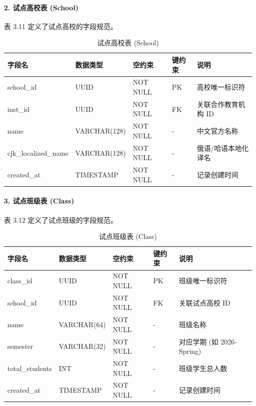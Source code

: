 \paragraph{2. 试点高校表 (School)}
表 3.11 定义了试点高校的字段规范。
\begin{table}[H]
\centering
\caption{试点高校表 (School)}
\begin{tabularx}{\textwidth}{l p{3.2cm} p{1.8cm} p{1.8cm} X}
\toprule
\textbf{字段名} & \textbf{数据类型} & \textbf{空约束} & \textbf{键约束} & \textbf{说明} \\
\midrule
school\_id & UUID & NOT NULL & PK & 高校唯一标识符 \\
inst\_id & UUID & NOT NULL & FK & 关联合作教育机构 ID \\
name & VARCHAR(128) & NOT NULL & - & 中文官方名称 \\
cjk\_localized\_name & VARCHAR(128) & NOT NULL & - & 俄语/哈语本地化译名 \\
created\_at & TIMESTAMP & NOT NULL & - & 记录创建时间 \\
\bottomrule
\end{tabularx}
\end{table}

\paragraph{3. 试点班级表 (Class)}
表 3.12 定义了试点班级的字段规范。
\begin{table}[H]
\centering
\caption{试点班级表 (Class)}
\begin{tabularx}{\textwidth}{l p{3.2cm} p{1.8cm} p{1.8cm} X}
\toprule
\textbf{字段名} & \textbf{数据类型} & \textbf{空约束} & \textbf{键约束} & \textbf{说明} \\
\midrule
class\_id & UUID & NOT NULL & PK & 班级唯一标识符 \\
school\_id & UUID & NOT NULL & FK & 关联试点高校 ID \\
name & VARCHAR(64) & NOT NULL & - & 班级名称 \\
semester & VARCHAR(32) & NOT NULL & - & 对应学期 (如 2026-Spring) \\
total\_students & INT & NOT NULL & - & 班级学生总人数 \\
created\_at & TIMESTAMP & NOT NULL & - & 记录创建时间 \\
\bottomrule
\end{tabularx}
\end{table}


